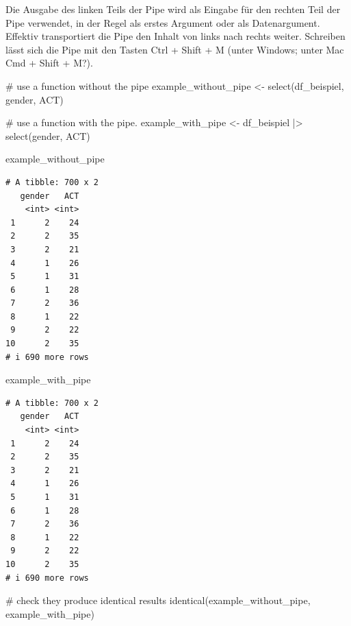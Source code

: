 \documentclass[
  letterpaper,
  DIV=11,
  numbers=noendperiod]{scrreprt}
\newenvironment{Shaded}{\begin{snugshade}}{\end{snugshade}}
\newcommand{\CommentTok}[1]{\textcolor[rgb]{0.37,0.37,0.37}{#1}}
\newcommand{\FunctionTok}[1]{\textcolor[rgb]{0.28,0.35,0.67}{#1}}
\newcommand{\NormalTok}[1]{\textcolor[rgb]{0.00,0.23,0.31}{#1}}
\newcommand{\OtherTok}[1]{\textcolor[rgb]{0.00,0.23,0.31}{#1}}
\newcommand{\SpecialCharTok}[1]{\textcolor[rgb]{0.37,0.37,0.37}{#1}}
\begin{document}
Die Ausgabe des linken Teils der Pipe wird als Eingabe für den rechten
Teil der Pipe verwendet, in der Regel als erstes Argument oder als
Datenargument. Effektiv transportiert die Pipe den Inhalt von links nach
rechts weiter. Schreiben lässt sich die Pipe mit den Tasten Ctrl + Shift
+ M (unter Windows; unter Mac Cmd + Shift + M?).

\begin{Shaded}
\begin{Highlighting}[]
\CommentTok{\# use a function without the pipe}
\NormalTok{example\_without\_pipe }\OtherTok{\textless{}{-}} \FunctionTok{select}\NormalTok{(df\_beispiel, gender, ACT)}

\CommentTok{\# use a function with the pipe. }
\NormalTok{example\_with\_pipe }\OtherTok{\textless{}{-}}\NormalTok{ df\_beispiel }\SpecialCharTok{|\textgreater{}} 
  \FunctionTok{select}\NormalTok{(gender, ACT)}


\NormalTok{example\_without\_pipe}
\end{Highlighting}
\end{Shaded}

\begin{verbatim}
# A tibble: 700 x 2
   gender   ACT
    <int> <int>
 1      2    24
 2      2    35
 3      2    21
 4      1    26
 5      1    31
 6      1    28
 7      2    36
 8      1    22
 9      2    22
10      2    35
# i 690 more rows
\end{verbatim}

\begin{Shaded}
\begin{Highlighting}[]
\NormalTok{example\_with\_pipe}
\end{Highlighting}
\end{Shaded}

\begin{verbatim}
# A tibble: 700 x 2
   gender   ACT
    <int> <int>
 1      2    24
 2      2    35
 3      2    21
 4      1    26
 5      1    31
 6      1    28
 7      2    36
 8      1    22
 9      2    22
10      2    35
# i 690 more rows
\end{verbatim}

\begin{Shaded}
\begin{Highlighting}[]
\CommentTok{\# check they produce identical results}
\FunctionTok{identical}\NormalTok{(example\_without\_pipe, example\_with\_pipe)}
\end{Highlighting}
\end{Shaded}
\end{document}
